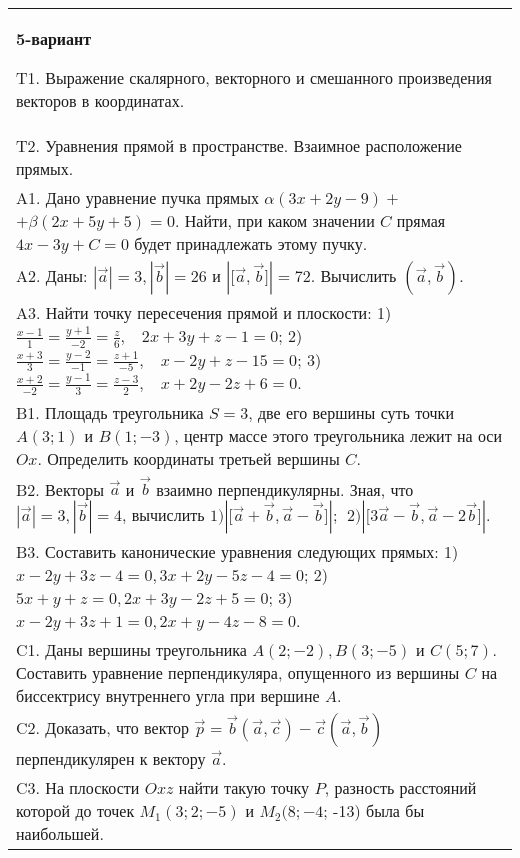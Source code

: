 \documentclass{article}
\begin{document}
\begin{tabular}{m{17cm}}
\textbf{5-вариант}
\newline

T1. 
Выражение скалярного, векторного и смешанного произведения векторов в координатах.
 \\
T2. 
Уравнения прямой в пространстве. Взаимное расположение прямых.
 \\
A1. 
Дано уравнение пучка прямых \(\alpha(3x + 2y - 9) +\) \(+ \beta(2x + 5y + 5) = 0\). Найти, при каком значении \(C\) прямая \(4x - 3y + C = 0\) будет принадлежать этому пучку.
 \\
A2. 
Даны: \(|\overrightarrow{a}| = 3,|\overrightarrow{b}| = 26\) и \(|\lbrack\overrightarrow{a},\overrightarrow{b}\rbrack| = 72\). Вычислить \(\left( \overrightarrow{a},\overrightarrow{b} \right)\).
 \\
A3. 
Найти точку пересечения прямой и плоскости: 1) \(\frac{x - 1}{1} = \frac{y + 1}{- 2} = \frac{z}{6},\ \ \ \ 2x + 3y + z - 1 = 0\); 2) \(\frac{x + 3}{3} = \frac{y - 2}{- 1} = \frac{z + 1}{- 5},\ \ \ \ x - 2y + z - 15 = 0\); 3) \(\frac{x + 2}{- 2} = \frac{y - 1}{3} = \frac{z - 3}{2},\ \ \ \ x + 2y - 2z + 6 = 0\).
 \\
B1. 
Площадь треугольника \(S = 3\), две его вершины суть точки \(A(3;1)\) и \(B(1; - 3)\), центр массе этого треугольника лежит на оси \(Ox\). Определить координаты третьей вершины \(C\).
 \\
B2. 
Векторы \(\overrightarrow{a}\) и \(\overrightarrow{b}\) взаимно перпендикулярны. Зная, что \(|\overrightarrow{a}| = 3,|\overrightarrow{b}| = 4\), вычислить \(1)|\lbrack\overrightarrow{a} + \overrightarrow{b},\overrightarrow{a} - \overrightarrow{b}\rbrack|;\ \ 2)|\lbrack 3\overrightarrow{a} - \overrightarrow{b},\overrightarrow{a} - 2\overrightarrow{b}\rbrack|\).
 \\
B3. 
Составить канонические уравнения следующих прямых: 1) \(x - 2y + 3z - 4 = 0,3x + 2y - 5z - 4 = 0\); 2) \(5x + y + z = 0,2x + 3y - 2z + 5 = 0\); 3) \(x - 2y + 3z + 1 = 0,2x + y - 4z - 8 = 0\).
 \\
C1. 
Даны вершины треугольника \(A(2; - 2),B(3; - 5)\) и \(C(5;7)\). Составить уравнение перпендикуляра, опущенного из вершины \(C\) на биссектрису внутреннего угла при вершине \(A\).
 \\
C2. 
Доказать, что вектор \(\overrightarrow{p} = \overrightarrow{b}(\overrightarrow{a},\overrightarrow{c}) - \overrightarrow{c}(\overrightarrow{a},\overrightarrow{b})\) перпендикулярен к вектору \(\overrightarrow{a}\).
 \\
C3. 
На плоскости \(Oxz\) найти такую точку \(P\), разность расстояний которой до точек \(M_{1}(3;2; - 5)\) и \(M_{2}(8; - 4\); -13) была бы наибольшей.
 \\

\end{tabular}
\vspace{1cm}
\end{document}
